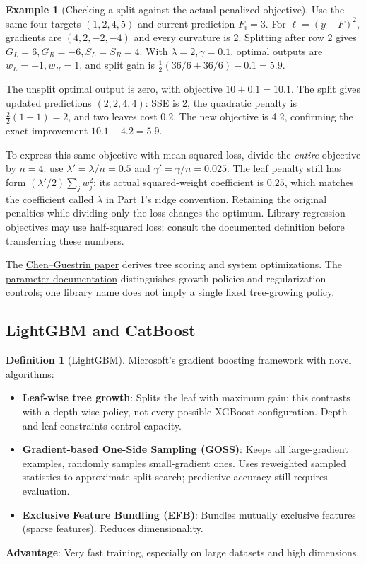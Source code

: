 \documentclass[11pt,twoside]{article}
\numberwithin{equation}{section}
\theoremstyle{plain}
\theoremstyle{definition}
\newtheorem{definition}[theorem]{Definition}
\newtheorem{example}[theorem]{Example}
\theoremstyle{remark}
\begin{document}
\begin{example}[Checking a split against the actual penalized objective]
Use the same four targets $(1,2,4,5)$ and current prediction $F_i=3$. For $\ell=(y-F)^2$, gradients are $(4,2,-2,-4)$ and every curvature is 2. Splitting after row 2 gives $G_L=6,G_R=-6,S_L=S_R=4$. With $\lambda=2,\gamma=0.1$, optimal outputs are $w_L=-1,w_R=1$, and split gain is $\tfrac12(36/6+36/6)-0.1=5.9$.

The unsplit optimal output is zero, with objective $10+0.1=10.1$. The split gives updated predictions $(2,2,4,4)$: SSE is 2, the quadratic penalty is $\tfrac22(1+1)=2$, and two leaves cost $0.2$. The new objective is 4.2, confirming the exact improvement $10.1-4.2=5.9$.

To express this same objective with mean squared loss, divide the \emph{entire} objective by $n=4$: use $\lambda'=\lambda/n=0.5$ and $\gamma'=\gamma/n=0.025$. The leaf penalty still has form $(\lambda'/2)\sum_jw_j^2$: its actual squared-weight coefficient is $0.25$, which matches the coefficient called $\lambda$ in Part 1's ridge convention. Retaining the original penalties while dividing only the loss changes the optimum. Library regression objectives may use half-squared loss; consult the documented definition before transferring these numbers.
\end{example}
The \href{https://arxiv.org/abs/1603.02754}{Chen--Guestrin paper} derives tree scoring and system optimizations. The \href{https://xgboost.readthedocs.io/en/stable/parameter.html}{parameter documentation} distinguishes growth policies and regularization controls; one library name does not imply a single fixed tree-growing policy.

\subsection{LightGBM and CatBoost}

\begin{definition}[LightGBM]
Microsoft's gradient boosting framework with novel algorithms:

\begin{itemize}
\item \textbf{Leaf-wise tree growth}: Splits the leaf with maximum gain; this contrasts with a depth-wise policy, not every possible XGBoost configuration. Depth and leaf constraints control capacity.
\item \textbf{Gradient-based One-Side Sampling (GOSS)}: Keeps all large-gradient examples, randomly samples small-gradient ones. Uses reweighted sampled statistics to approximate split search; predictive accuracy still requires evaluation.
\item \textbf{Exclusive Feature Bundling (EFB)}: Bundles mutually exclusive features (sparse features). Reduces dimensionality.
\end{itemize}

\textbf{Advantage}: Very fast training, especially on large datasets and high dimensions.
\end{definition}
\end{document}

